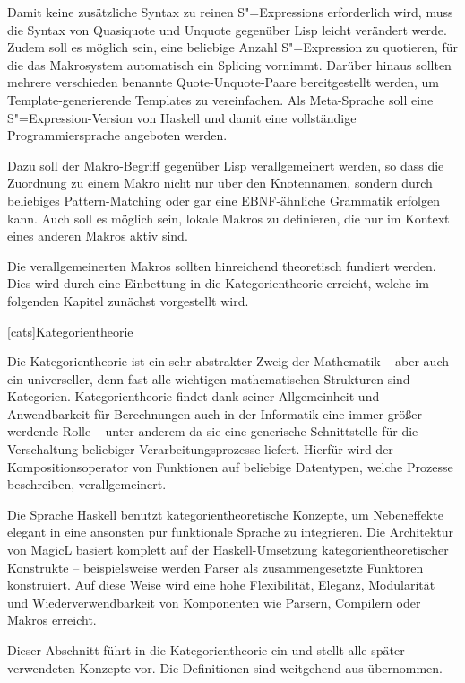 \documentclass[11pt, a4paper, bibgerm]{scrbook}
\newcommand\lchapter{}
\newcommand{\sexp}{S"=Expression}
\newcommand{\sexps}{S"=Expressions}
\begin{document}
Damit keine zusätzliche Syntax zu reinen \sexps{} erforderlich wird,
muss die Syntax von Quasiquote und Unquote gegenüber Lisp leicht
verändert werde. Zudem soll es möglich sein, eine beliebige Anzahl
\sexp{} zu quotieren, für die das Makrosystem automatisch ein Splicing
vornimmt. Darüber hinaus sollten mehrere verschieden benannte
Quote-Unquote-Paare bereitgestellt werden, um Template-generierende
Templates zu vereinfachen. Als Meta-Sprache soll eine \sexp{}-Version
von Haskell und damit eine vollständige Programmiersprache
angeboten werden.

Dazu soll der Makro-Begriff gegenüber Lisp verallgemeinert werden, so
dass die Zuordnung zu einem Makro nicht nur über den Knotennamen,
sondern durch beliebiges Pattern-Matching oder gar eine EBNF-ähnliche
Grammatik erfolgen kann. Auch soll es möglich sein, lokale Makros zu
definieren, die nur im Kontext eines anderen Makros aktiv sind.  

Die verallgemeinerten Makros sollten hinreichend theoretisch fundiert
werden. Dies wird durch eine Einbettung in die Kategorientheorie
erreicht, welche im folgenden Kapitel zunächst vorgestellt wird.

\lchapter[cats]{Kategorientheorie}

Die Kategorientheorie ist ein sehr abstrakter Zweig der Mathematik --
aber auch ein universeller, denn fast alle wichtigen mathematischen
Strukturen sind Kategorien. Kategorientheorie findet dank seiner
Allgemeinheit und Anwendbarkeit für Berechnungen auch in der Informatik
eine immer größer werdende Rolle -- unter anderem da sie eine generische
Schnittstelle für die Verschaltung beliebiger Verarbeitungsprozesse
liefert. Hierfür wird der Kompositionsoperator von Funktionen auf
beliebige Datentypen, welche Prozesse beschreiben, verallgemeinert.

Die Sprache Haskell benutzt kategorientheoretische Konzepte, um
Nebeneffekte elegant in eine ansonsten pur funktionale Sprache zu
integrieren. Die Architektur von MagicL basiert komplett auf der
Haskell-Umsetzung kategorientheoretischer Konstrukte -- beispielsweise
werden Parser als zusammengesetzte Funktoren konstruiert. Auf diese
Weise wird eine hohe Flexibilität, Eleganz, Modularität und
Wiederverwendbarkeit von Komponenten wie Parsern, Compilern oder Makros
erreicht.

Dieser Abschnitt führt in die Kategorientheorie ein und
stellt alle später verwendeten Konzepte vor. Die Definitionen sind
weitgehend aus \cite{Grundlagen} übernommen.
\end{document}
